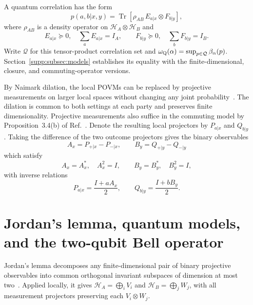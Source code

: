 \documentclass[aps,prl,onecolumn,10pt,superscriptaddress,nofootinbib,longbibliography]{revtex4-2}
\theoremstyle{remark}
\newcommand{\Tr}{\operatorname{Tr}}
\newcommand{\Q}{\mathcal Q}
\begin{document}
A quantum correlation has the form
\begin{equation}
p(a,b|x,y)=\Tr\!\left[\rho_{AB}\,E_{a|x}\otimes F_{b|y}\right],
\label{supp:eq:quantum-behavior}
\end{equation}
where $\rho_{AB}$ is a density operator on $\mathcal H_A\otimes\mathcal H_B$ and
\begin{equation}
E_{a|x}\succeq0,\quad\sum_aE_{a|x}=I_A,
\qquad
F_{b|y}\succeq0,\quad\sum_bF_{b|y}=I_B.
\label{supp:eq:povm-relations}
\end{equation}
Write $\Q$ for this tensor-product correlation set and $\omega_{\rm Q}(\alpha)=\sup_{p\in\Q}\beta_\alpha(p)$. Section~\ref{supp:subsec:models} establishes its equality with the finite-dimensional, closure, and commuting-operator versions.

By Naimark dilation, the local POVMs can be replaced by projective measurements on larger local spaces without changing any joint probability~\cite{Naimark1940}. The dilation is common to both settings at each party and preserves finite dimensionality. Projective measurements also suffice in the commuting model by Proposition~3.4(b) of Ref.~\cite{Fritz2012}. Denote the resulting local projectors by $P_{a|x}$ and $Q_{b|y}$. Taking the difference of the two outcome projectors gives the binary observables
\begin{equation}
A_x=P_{+|x}-P_{-|x},
\qquad B_y=Q_{+|y}-Q_{-|y}
\label{supp:eq:reflections}
\end{equation}
which satisfy
\begin{equation}
A_x=A_x^*,\quad A_x^2=I,
\qquad B_y=B_y^*,\quad B_y^2=I,
\label{supp:eq:reflection-relations}
\end{equation}
with inverse relations
\begin{equation}
P_{a|x}=\frac{I+aA_x}{2},
\qquad Q_{b|y}=\frac{I+bB_y}{2}.
\label{supp:eq:projector-reflection}
\end{equation}

\section{Jordan's lemma, quantum models, and the two-qubit Bell operator}
\label{supp:sec:jordan}

Jordan's lemma decomposes any finite-dimensional pair of binary projective observables into common orthogonal invariant subspaces of dimension at most two~\cite{Halmos1969,Masanes2005,PanwarPandyaWiesniak2022}. Applied locally, it gives $\mathcal H_A=\bigoplus_iV_i$ and $\mathcal H_B=\bigoplus_jW_j$, with all measurement projectors preserving each $V_i\otimes W_j$.
\end{document}
